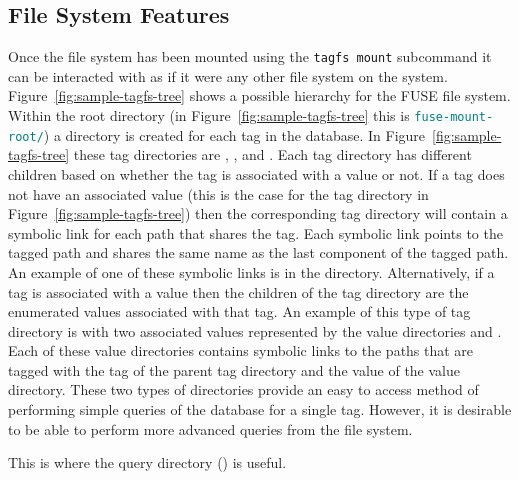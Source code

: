 \subsection{File System Features}
\label{sec:fs-features}

Once the file system has been mounted using the \texttt{tagfs mount} subcommand
it can be interacted with as if it were any other file system on the system.
Figure~\ref{fig:sample-tagfs-tree} shows a possible hierarchy for the FUSE file
system. Within the root directory (in Figure~\ref{fig:sample-tagfs-tree} this
is \texttt{\textcolor{teal}{fuse-mount-root/}}) a directory is created for each
tag in the database. In Figure~\ref{fig:sample-tagfs-tree} these tag
directories are , ,  and . Each
tag directory has different children based on whether the tag is associated
with a value or not. If a tag does not have an associated value (this is the
case for the  tag directory in
Figure~\ref{fig:sample-tagfs-tree}) then the corresponding tag directory will
contain a symbolic link for each path that shares the tag. Each symbolic link
points to the tagged path and shares the same name as the last component of the
tagged path. An example of one of these symbolic links is 
in the  directory. Alternatively, if a tag is associated with a
value then the children of the tag directory are the enumerated values
associated with that tag. An example of this type of tag directory is
 with two associated values represented by the value directories
 and . Each of these value directories contains symbolic
links to the paths that are tagged with the tag of the parent tag directory and
the value of the value directory. These two types of directories provide an
easy to access method of performing simple queries of the database for a single
tag. However, it is desirable to be able to perform more advanced queries from
the file system.

This is where the query directory () is useful. 


